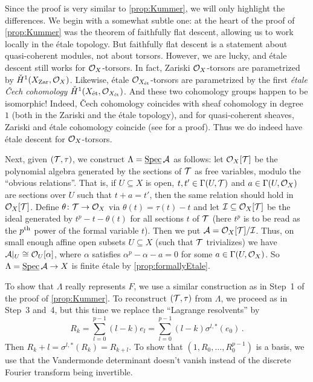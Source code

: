 \begin{proof*}
	Since the proof is very similar to \cref{prop:Kummer}, we will only highlight the differences. We begin with a somewhat subtle one: at the heart of the proof of \cref{prop:Kummer} was the theorem of faithfully flat descent, allowing us to work locally in the étale topology. But faithfully flat descent is a statement about quasi-coherent modules, not about torsors. However, we are lucky, and étale descent still works for $\mathcal{O}_X$-torsors. In fact, Zariski $\mathcal{O}_X$-torsors are parametrized by $\check{H}^1(X_{\mathrm{Zar}},\mathcal{O}_X)$. Likewise, étale $\mathcal{O}_{X_{\mathrm{\acute{e}t}}}$-torsors are parametrized by the first \emph{étale \v Cech cohomology} $\check{H}^1(X_{\mathrm{\acute{e}t}},\mathcal{O}_{X_{\mathrm{\acute{e}t}}})$. And these two cohomology groups happen to be isomorphic! Indeed, \v Cech cohomology coincides with sheaf cohomology in degree $1$ (both in the Zariski and the étale topology), and for quasi-coherent sheaves, Zariski and étale cohomology coincide (see \cite[]{stacks-project} for a proof). Thus we do indeed have étale descent for $\mathcal{O}_X$-torsors.
	
	Next, given $(\mathcal{T},\tau)$, we construct $\Lambda=\operatorname{\underline{\smash{\mathrm{Spec}}}}\mathcal{A}$ as follows: let $\mathcal{O}_X[\mathcal{T}]$ be the polynomial algebra generated by the sections of $\mathcal{T}$ as free variables, modulo the \enquote{obvious relations}. That is, if $U\subseteq X$ is open, $t,t'\in \operatorname{\Gamma}(U,\mathcal{T})$ and $a\in \operatorname{\Gamma}(U,\mathcal{O}_X)$ are sections over $U$ such that $t+a=t'$, then the same relation should hold in $\mathcal{O}_X[\mathcal{T}]$. Define $\theta\colon \Tt\morphism \Oo_X$ via $\theta(t)=\tau(t)-t$ and let $\mathcal{I}\subseteq \mathcal{O}_X[\mathcal{T}]$ be the ideal generated by $t^p-t-\theta(t)$ for all sections $t$ of $\mathcal{T}$ (here $t^p$ is to be read as the $p^{\text{th}}$ power of the formal variable $t$). Then we put $\mathcal{A}=\mathcal{O}_X[\mathcal{T}]/\mathcal{I}$. Thus, on small enough affine open subsets $U\subseteq X$ (such that $\mathcal{T}$ trivializes) we have $\mathcal{A}|_U\cong \mathcal{O}_U[\alpha]$, where $\alpha$ satisfies $\alpha^p-\alpha-a=0$ for some $a\in \operatorname{\Gamma}(U,\mathcal{O}_X)$. So $\Lambda=\SPEC\Aa\morphism X$ is finite étale by \cref{prop:formallyEtale}.
	
	To show that $\Lambda$ really represents $F$, we use a similar construction as in Step~1 of the proof of \cref{prop:Kummer}. To reconstruct $(\mathcal{T},\tau)$ from $\Lambda$, we proceed as in Step~3 and~4, but this time we replace the \enquote{Lagrange resolvents} by
	\begin{equation*}
		R_k=\sum_{l=0}^{p-1}(l-k)e_l=\sum_{l=0}^{p-1}(l-k)\sigma^{l,*}(e_0)\,.
	\end{equation*}
	Then $R_k+l=\sigma^{l,*}(R_k)=R_{k+l}$. To show that $(1,R_0,\dotsc,R_0^{p-1})$ is a basis, we use that the Vandermonde determinant doesn't vanish instead of the discrete Fourier transform being invertible. 
	

\end{proof*}
